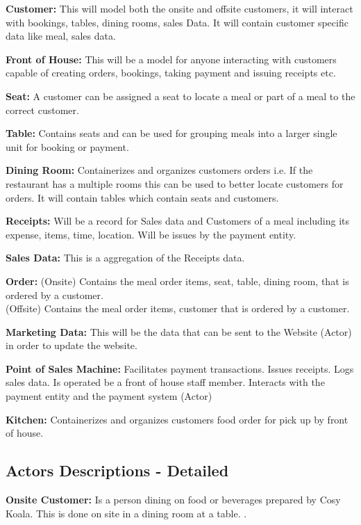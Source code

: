 \documentclass{article}
\begin{document}
\textbf{Customer:} This will model both the onsite and offsite customers, it will interact with bookings, tables, dining rooms, sales Data. It will contain customer specific data like meal, sales data.

\textbf{Front of House:} This will be a model for anyone interacting with customers capable of creating orders, bookings, taking payment and issuing receipts etc.

\textbf{Seat:} A customer can be assigned a seat to locate a meal or part of a meal to the correct customer.

\textbf{Table:} Contains seats and can be used for grouping meals into a larger single unit for booking or payment.

\textbf{Dining Room:} Containerizes and organizes customers orders i.e. If the restaurant has a multiple rooms this can be used to better locate customers for orders. It will contain tables which contain seats and customers.

\textbf{Receipts:} Will be a record for Sales data and Customers of a meal including its expense, items, time, location. Will be issues by the payment entity.

\textbf{Sales Data:} This is a aggregation of the Receipts data.

\textbf{Order:} (Onsite) Contains the meal order items, seat, table, dining room, that is ordered by a customer. \\(Offsite) Contains the meal order items, customer that is ordered by a customer.

\textbf{Marketing Data:} This will be the data that can be sent to the Website (Actor) in order to update the website.

\textbf{Point of Sales Machine:} Facilitates payment transactions. Issues receipts. Logs sales data. Is operated be a front of house staff member. Interacts with the payment entity and the payment system (Actor)

\textbf{Kitchen:} Containerizes and organizes customers food order for pick up by front of house.



\subsection{Actors Descriptions - Detailed}

\textbf{Onsite Customer:} Is a person dining on food or beverages prepared by Cosy Koala. This is done on site in a dining room at a table. .
\end{document}
